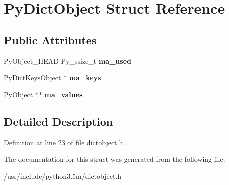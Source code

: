 \hypertarget{structPyDictObject}{}\section{Py\+Dict\+Object Struct Reference}
\label{structPyDictObject}
\subsection*{Public Attributes}
\begin{DoxyCompactItemize}
\item 
Py\+Object\+\_\+\+H\+E\+AD Py\+\_\+ssize\+\_\+t {\bfseries ma\+\_\+used}\hypertarget{structPyDictObject_a68892f8c5d4ed63ac4dc04d2cc37b096}{}\label{structPyDictObject_a68892f8c5d4ed63ac4dc04d2cc37b096}

\item 
Py\+Dict\+Keys\+Object $\ast$ {\bfseries ma\+\_\+keys}\hypertarget{structPyDictObject_ac4d41a81daa041b85346ce8b8ce06f0e}{}\label{structPyDictObject_ac4d41a81daa041b85346ce8b8ce06f0e}

\item 
\hyperlink{struct__object}{Py\+Object} $\ast$$\ast$ {\bfseries ma\+\_\+values}\hypertarget{structPyDictObject_af735566d77931af9417d4574e723de89}{}\label{structPyDictObject_af735566d77931af9417d4574e723de89}

\end{DoxyCompactItemize}


\subsection{Detailed Description}


Definition at line 23 of file dictobject.\+h.



The documentation for this struct was generated from the following file\+:\begin{DoxyCompactItemize}
\item 
/usr/include/python3.\+5m/dictobject.\+h\end{DoxyCompactItemize}
